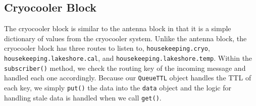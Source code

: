 \subsection{Cryocooler Block}
The cryocooler block is similar to the antenna block in that it is a simple dictionary of values from the cryocooler system.
Unlike the antenna block, the cryocooler block has three routes to listen to, \texttt{housekeeping.cryo}, \texttt{housekeeping.lakeshore.cal}, and \texttt{housekeeping.lakeshore.temp}.
Within the \texttt{subscriber()} method, we check the routing key of the incoming message and handled each one accordingly. 
Because our \texttt{QueueTTL} object handles the TTL of each key, we simply \texttt{put()} the data into the \texttt{data} object and the logic for handling stale data is handled when we call \texttt{get()}. 

